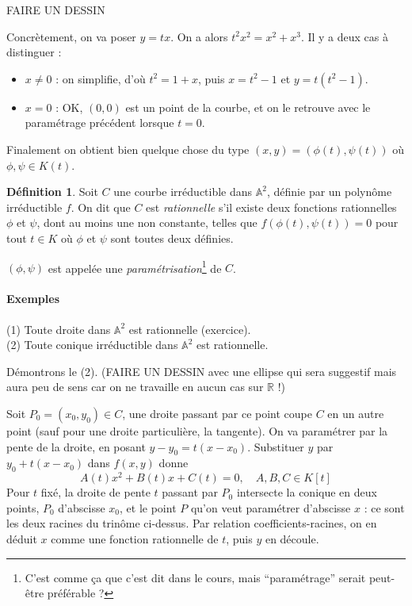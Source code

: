 \documentclass[a4paper, 11pt]{article}
\theoremstyle{definition}
\newtheorem{définition}{Définition}
\newcommand{\real}{\mathbb{R}}
\newcommand{\aff}{\mathbb{A}}
\begin{document}
FAIRE UN DESSIN

Concrètement, on va poser $y = tx$. On a alors $t^2 x^2 = x^2 +
x^3$. Il y a deux cas à distinguer :
\begin{itemize}
\item $x \neq 0$ : on simplifie, d'où $t^2 = 1 + x$, puis $x = t^2 -
1$ et $y = t(t^2 - 1)$.
\item $x=0$ : OK, $(0,0)$ est un point de la courbe, et on le retrouve
avec le paramétrage précédent lorsque $t=0$.
\end{itemize}
Finalement on obtient bien quelque chose du type
$(x,y) = (\phi(t), \psi(t))$ où $\phi, \psi \in K(t)$.

\begin{définition}
  Soit $C$ une courbe irréductible dans $\aff^2$, définie par un
  polynôme irréductible $f$. On dit que $C$ est \emph{rationnelle}
  s'il existe deux fonctions rationnelles $\phi$ et $\psi$, dont au
  moins une non constante, telles que $f(\phi(t),\psi(t)) = 0$ pour
  tout $t \in K$ où $\phi$ et $\psi$ sont toutes deux définies.
  
  $(\phi, \psi)$ est appelée une \emph{paramétrisation}\footnote{C'est
    comme ça que c'est dit dans le cours, mais \enquote{paramétrage}
    serait peut-être préférable ?} de $C$.
\end{définition}

\paragraph{Exemples} (1) Toute droite dans $\aff^2$ est rationnelle (exercice).\\
(2) Toute conique irréductible dans $\aff^2$ est rationnelle.

Démontrons le (2). (FAIRE UN DESSIN avec une ellipse qui sera
suggestif mais aura peu de sens car on ne travaille en aucun cas sur
$\real$ !)

Soit $P_0 = (x_0, y_0) \in C$, une droite passant par ce point coupe $C$ en
un autre point (sauf pour une droite particulière, la tangente). On va
paramétrer par la pente de la droite, en posant $y-y_0 =
t(x-x_0)$. Substituer $y$ par $y_0 + t(x-x_0)$ dans $f(x,y)$ donne
\[ A(t)x^2 + B(t)x + C(t) = 0, \quad A,B,C \in K[t] \]
Pour $t$ fixé, la droite de pente $t$ passant par $P_0$ intersecte la
conique en deux points, $P_0$ d'abscisse $x_0$, et le point $P$ qu'on
veut paramétrer d'abscisse $x$ : ce sont les deux racines du trinôme
ci-dessus. Par relation coefficients-racines, on en déduit $x$ comme
une fonction rationnelle de $t$, puis $y$ en découle.
\end{document}
